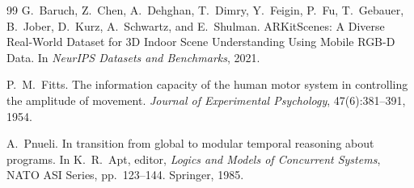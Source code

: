 \documentclass[11pt,letterpaper]{article}
\begin{document}
\begin{thebibliography}{99}
G.~Baruch, Z.~Chen, A.~Dehghan, T.~Dimry, Y.~Feigin, P.~Fu, T.~Gebauer, B.~Jober, D.~Kurz, A.~Schwartz, and E.~Shulman.
\newblock ARKitScenes: A Diverse Real-World Dataset for 3D Indoor Scene Understanding Using Mobile RGB-D Data.
\newblock In \emph{NeurIPS Datasets and Benchmarks}, 2021.

P.~M.~Fitts.
\newblock The information capacity of the human motor system in controlling the amplitude of movement.
\newblock \emph{Journal of Experimental Psychology}, 47(6):381--391, 1954.

A.~Pnueli.
\newblock In transition from global to modular temporal reasoning about programs.
\newblock In K.~R.~Apt, editor, \emph{Logics and Models of Concurrent Systems}, NATO ASI Series, pp.~123--144. Springer, 1985.

\end{thebibliography}
\end{document}
